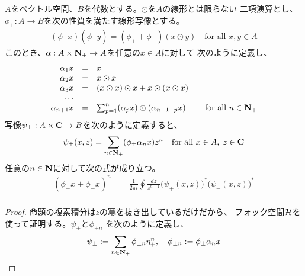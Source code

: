 {	\begin{proposition}[ベクトル空間から代数]\label{prop:ベクトル空間から代数} %
		$A$をベクトル空間、$B$を代数とする。$\odot$を$A$の線形とは限らない
		二項演算とし、$\phi_\pm:A\to B$を次の性質を満たす線形写像とする。
		\begin{equation*}\begin{split}
			(\phi_-x)(\phi_+y) = (\phi_+ + \phi_-)(x\odot y)
			\quad\text{for all } x,y\in A
		\end{split}\end{equation*}
		このとき、$\alpha:A\times\mathbf{N}_+\to A$を任意の$x\in A$に対して
		次のように定義し、
		\begin{equation*}\begin{array}{rcll}
			\alpha_1x &=& x \\
			\alpha_2x &=& x\odot x \\
			\alpha_3x &=& (x\odot x)\odot x + x\odot(x\odot x) \\
			\cdots \\
			\alpha_{n+1}x &=& \sum_{p=1}^n (\alpha_px)\odot(\alpha_{n+1-p}x)
			& \quad\text{for all } n\in\mathbf{N}_+
		\end{array}\end{equation*}
		写像$\psi_\pm:A\times\mathbf{C}\to B$を次のように定義すると、
		\begin{equation*}\begin{split}
			\psi_\pm(x,z) = \sum_{n\in\mathbf{N}_+}(\phi_\pm\alpha_nx)z^n
			\quad\text{for all } x\in A,\; z\in\mathbf{C}
		\end{split}\end{equation*}
		任意の$n\in\mathbf{N}$に対して次の式が成り立つ。
		\begin{equation*}\begin{split}
			(\phi_+x + \phi_-x)^n &= \frac{1}{2\pi i} \oint \frac{dz}{z^{n+1}} 
				\bigl(\psi_+(x,z)\bigr)^*\bigl(\psi_-(x,z)\bigr)^* \\
		\end{split}\end{equation*}
	\end{proposition} %
	\begin{proof} %
		命題の複素積分は$z$の冪を抜き出しているだけだから、
		フォック空間${{\mathcal{H}}}$を使って証明する。$\psi_{\pm}$と$\phi_{\pm n}$
		を次のように定義し、
		\begin{equation*}\begin{split}
			\psi_\pm := \sum_{n\in\sizen_+}\phi_{\pm n}\eta_+^n
			,\quad \phi_{\pm n} := \phi_\pm\alpha_nx

\end{split}
\end{equation*}
\end{proof}}
